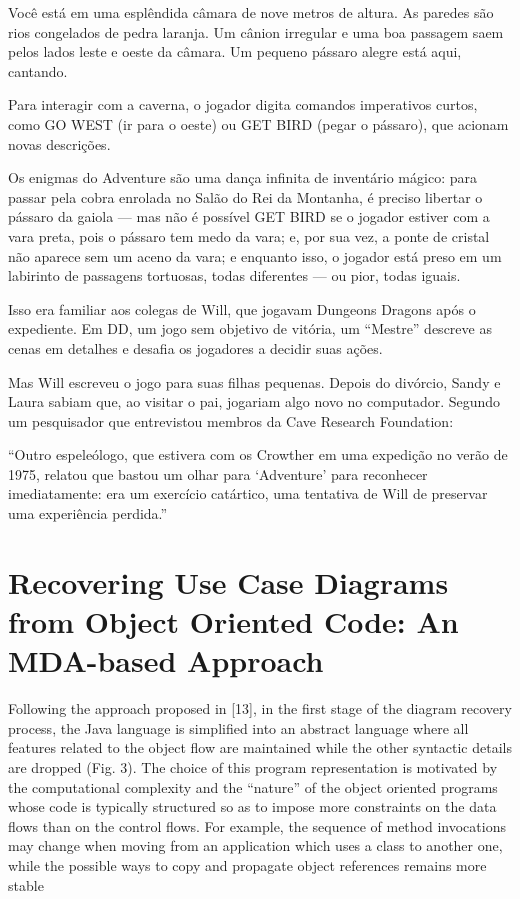\documentclass[12pt,a4paper]{article}
\begin{document}
Você está em uma esplêndida câmara de nove metros de altura.
As paredes são rios congelados de pedra laranja.
Um cânion irregular e uma boa passagem saem pelos lados leste e oeste da câmara.
Um pequeno pássaro alegre está aqui, cantando.

Para interagir com a caverna, o jogador digita comandos imperativos curtos, como
GO WEST (ir para o oeste) ou GET BIRD (pegar o pássaro),
que acionam novas descrições.

Os enigmas do Adventure são uma dança infinita de inventário mágico:
para passar pela cobra enrolada no Salão do Rei da Montanha, é preciso libertar o pássaro da gaiola —
mas não é possível GET BIRD se o jogador estiver com a vara preta, pois o pássaro tem medo da vara;
e, por sua vez, a ponte de cristal não aparece sem um aceno da vara;
e enquanto isso, o jogador está preso em um labirinto de passagens tortuosas,
todas diferentes — ou pior, todas iguais.

Isso era familiar aos colegas de Will, que jogavam Dungeons Dragons após o expediente.
Em DD, um jogo sem objetivo de vitória, um “Mestre” descreve as cenas em detalhes e desafia os jogadores a decidir suas ações.

Mas Will escreveu o jogo para suas filhas pequenas.
Depois do divórcio, Sandy e Laura sabiam que, ao visitar o pai, jogariam algo novo no computador.
Segundo um pesquisador que entrevistou membros da Cave Research Foundation:

“Outro espeleólogo, que estivera com os Crowther em uma expedição no verão de 1975, relatou que bastou um olhar para ‘Adventure’ para reconhecer imediatamente:
era um exercício catártico, uma tentativa de Will de preservar uma experiência perdida.”

\section{Recovering Use Case Diagrams from Object Oriented Code: An MDA-based Approach}

Following the approach proposed in [13], in the first stage of the
diagram recovery process, the Java language is simplified into an abstract
language where all features related to the object flow are maintained while the
other syntactic details are dropped (Fig. 3). The choice of this program
representation is motivated by the computational complexity and the “nature”
of the object oriented programs whose code is typically structured so as to
impose more constraints on the data flows than on the control flows. For
example, the sequence of method invocations may change when moving from
an application which uses a class to another one, while the possible ways to
copy and propagate object references remains more stable
\end{document}
